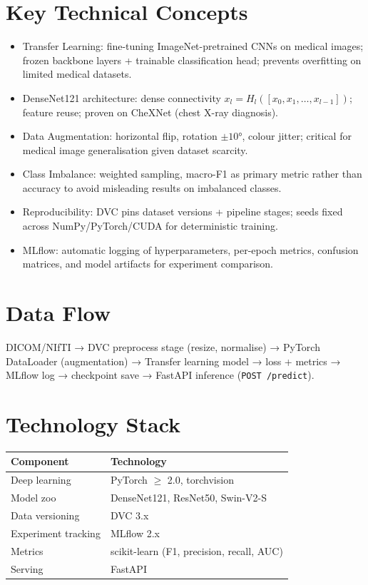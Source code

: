 \documentclass[11pt,a4paper]{article}
\begin{document}
\section{Key Technical Concepts}
\begin{itemize}[leftmargin=1.5em]
  \item Transfer Learning: fine-tuning ImageNet-pretrained CNNs on medical images; frozen backbone layers + trainable classification head; prevents overfitting on limited medical datasets.
  \item DenseNet121 architecture: dense connectivity $x_l = H_l([x_0, x_1, \ldots, x_{l-1}])$; feature reuse; proven on CheXNet (chest X-ray diagnosis).
  \item Data Augmentation: horizontal flip, rotation $\pm 10°$, colour jitter; critical for medical image generalisation given dataset scarcity.
  \item Class Imbalance: weighted sampling, macro-F1 as primary metric rather than accuracy to avoid misleading results on imbalanced classes.
  \item Reproducibility: DVC pins dataset versions + pipeline stages; seeds fixed across NumPy/PyTorch/CUDA for deterministic training.
  \item MLflow: automatic logging of hyperparameters, per-epoch metrics, confusion matrices, and model artifacts for experiment comparison.
\end{itemize}

\section{Data Flow}

DICOM/NIfTI → DVC preprocess stage (resize, normalise) →
PyTorch DataLoader (augmentation) →
Transfer learning model → loss + metrics →
MLflow log → checkpoint save →
FastAPI inference (\texttt{POST /predict}).


\section{Technology Stack}

\begin{tabular}{ll}
\toprule
\textbf{Component} & \textbf{Technology} \\
\midrule
Deep learning & PyTorch $\geq$ 2.0, torchvision \\
Model zoo & DenseNet121, ResNet50, Swin-V2-S \\
Data versioning & DVC 3.x \\
Experiment tracking & MLflow 2.x \\
Metrics & scikit-learn (F1, precision, recall, AUC) \\
Serving & FastAPI \\
\bottomrule
\end{tabular}
\end{document}
